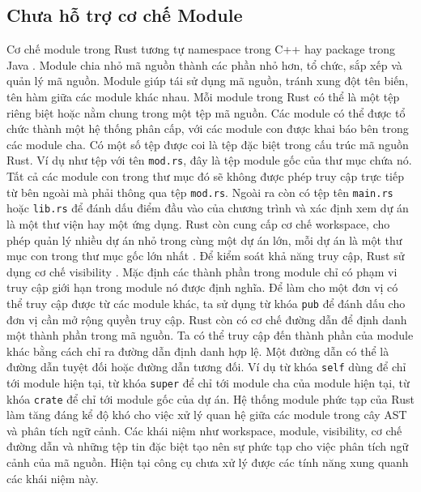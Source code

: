 \subsection{Chưa hỗ trợ cơ chế Module}

Cơ chế module trong Rust tương tự namespace trong C++ hay package trong Java \cite{rustlangManagingGrowing}.
Module chia nhỏ mã nguồn thành các phần nhỏ hơn, tổ chức, sắp xếp và quản lý mã nguồn.
Module giúp tái sử dụng mã nguồn, tránh xung đột tên biến, tên hàm giữa các module khác nhau.
Mỗi module trong Rust có thể là một tệp riêng biệt hoặc nằm chung trong một tệp mã nguồn.
Các module có thể được tổ chức thành một hệ thống phân cấp, với các module con được khai báo bên trong các module cha.
Có một số tệp được coi là tệp đặc biệt trong cấu trúc mã nguồn Rust.
Ví dụ như tệp với tên \texttt{mod.rs}, đây là tệp module gốc của thư mục chứa nó.
Tất cả các module con trong thư mục đó sẽ không được phép truy cập trực tiếp từ bên ngoài mà phải thông qua tệp \texttt{mod.rs}.
Ngoài ra còn có tệp tên \texttt{main.rs} hoặc \texttt{lib.rs} để đánh dấu điểm đầu vào của chương trình và xác định xem dự án là một thư viện hay một ứng dụng.
Rust còn cung cấp cơ chế workspace, cho phép quản lý nhiều dự án nhỏ trong cùng một dự án lớn, mỗi dự án là một thư mục con trong thư mục gốc lớn nhất \cite{rustlangCargoWorkspaces}.
Để kiểm soát khả năng truy cập, Rust sử dụng cơ chế visibility \cite{rustlangVisibilityPrivacy}.
Mặc định các thành phần trong module chỉ có phạm vi truy cập giới hạn trong module nó được định nghĩa.
Để làm cho một đơn vị có thể truy cập được từ các module khác, ta sử dụng từ khóa \texttt{pub} để đánh dấu cho đơn vị cần mở rộng quyền truy cập.
Rust còn có cơ chế đường dẫn để định danh một thành phần trong mã nguồn.
Ta có thể truy cập đến thành phần của module khác bằng cách chỉ ra đường dẫn định danh hợp lệ.
Một đường dẫn có thể là đường dẫn tuyệt đối hoặc đường dẫn tương đối.
Ví dụ từ khóa \texttt{self} dùng để chỉ tới module hiện tại, từ khóa \texttt{super} để chỉ tới module cha của module hiện tại, từ khóa \texttt{crate} để chỉ tới module gốc của dự án.
Hệ thống module phức tạp của Rust làm tăng đáng kể độ khó cho việc xử lý quan hệ giữa các module trong cây AST và phân tích ngữ cảnh.
Các khái niệm như workspace, module, visibility, cơ chế đường dẫn và những tệp tin đặc biệt tạo nên sự phức tạp cho việc phân tích ngữ cảnh của mã nguồn.
Hiện tại công cụ chưa xử lý được các tính năng xung quanh các khái niệm này.


